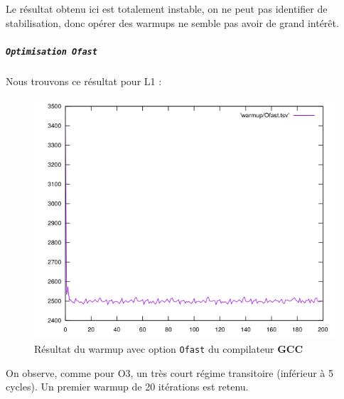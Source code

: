\documentclass{report}
\begin{document}
  Le résultat obtenu ici est totalement instable, on ne peut pas identifier de stabilisation, donc opérer des warmups ne semble pas avoir de grand intérêt.
  \newpage
\subparagraph{ \texttt{Optimisation Ofast}}
Nous trouvons ce résultat pour L1 :
\begin{figure}[ht!]
  \centering
\includegraphics[scale=0.45]{resources/L1/warmup/Ofast.png}
  \caption{Résultat du warmup avec option \texttt{Ofast} du compilateur \textbf{GCC}}
\end{figure}

On observe, comme pour O3, un très court régime transitoire (inférieur à 5 cycles). Un premier warmup de 20 itérations est retenu.

\newpage
\end{document}

